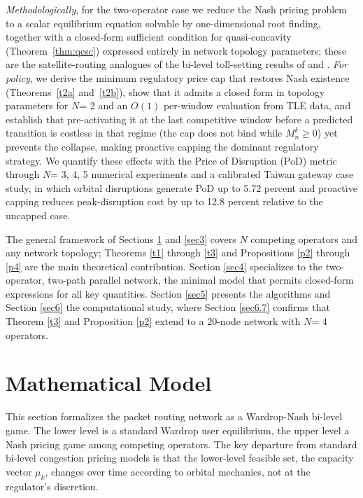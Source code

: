 \documentclass[review,3p,authoryear]{elsarticle}
\begin{document}
\emph{Methodologically}, for the two-operator case we reduce the Nash pricing problem to a scalar equilibrium equation solvable by one-dimensional root finding, together with a closed-form sufficient condition for quasi-concavity (Theorem~\ref{thm:qcsc}) expressed entirely in network topology parameters; these are the satellite-routing analogues of the bi-level toll-setting results of \cite{labbe1998bilevel} and \cite{dewez2008new}. \emph{For policy}, we derive the minimum regulatory price cap that restores Nash existence (Theorems~\ref{t2a} and~\ref{t2b}), show that it admits a closed form in topology parameters for $N$= 2 and an $O(1)$ per-window evaluation from TLE data, and establish that pre-activating it at the last competitive window before a predicted transition is costless in that regime (the cap does not bind while $M_{n}^{k} \ge 0$) yet prevents the collapse, making proactive capping the dominant regulatory strategy. We quantify these effects with the Price of Disruption (PoD) metric through $N$= 3, 4, 5 numerical experiments and a calibrated Taiwan gateway case study, in which orbital disruptions generate PoD up to 5.72 percent and proactive capping reduces peak-disruption cost by up to 12.8 percent relative to the uncapped case.

The general framework of Sections \ref{sec2} and \ref{sec3} covers $N$ competing operators and any network topology; Theorems \ref{t1} through \ref{t3} and Propositions \ref{p2} through \ref{p4} are the main theoretical contribution. Section \ref{sec4} specializes to the two-operator, two-path parallel network, the minimal model that permits closed-form expressions for all key quantities. Section \ref{sec5} presents the algorithms and Section \ref{sec6} the computational study, where Section \ref{sec6.7} confirms that Theorem \ref{t3} and Proposition \ref{p2} extend to a 20-node network with $N$= 4 operators.

\section{Mathematical Model}
\label{sec2}

This section formalizes the packet routing network as a Wardrop-Nash bi-level game. The
lower level is a standard Wardrop user equilibrium, the upper level a Nash pricing game
among competing operators. The key departure from standard bi-level congestion pricing
models is that the lower-level feasible set, the capacity vector ${\mu}_{k}$, changes over time according
to orbital mechanics, not at the regulator's discretion.
\end{document}
